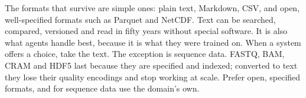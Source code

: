 The formats that survive are simple ones: plain text, Markdown, CSV, and open,
well-specified formats such as Parquet and NetCDF. Text can be searched,
compared, versioned and read in fifty years without special software. It is also
what agents handle best, because it is what they were trained on. When a system
offers a choice, take the text. The exception is sequence data. FASTQ, BAM,
CRAM and HDF5 last because they are specified and indexed; converted to text
they lose their quality encodings and stop working at scale. Prefer open,
specified formats, and for sequence data use the domain's own.
